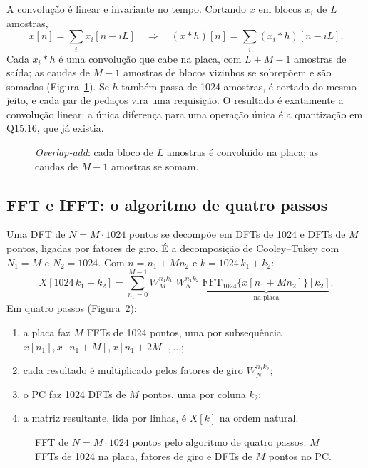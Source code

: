 A convolução é linear e invariante no tempo. Cortando \(x\) em blocos \(x_i\) de
\(L\) amostras,
\[
  x[n] = \sum_i x_i[n - iL]
  \quad\Longrightarrow\quad
  (x * h)[n] = \sum_i (x_i * h)[n - iL].
\]
Cada \(x_i * h\) é uma convolução que cabe na placa, com \(L + M - 1\) amostras
de saída; as caudas de \(M - 1\) amostras de blocos vizinhos se sobrepõem e são
somadas (Figura~\ref{fig:overlap-add}). Se \(h\) também passa de 1024
amostras, é cortado do mesmo jeito, e cada par de pedaços vira uma requisição.
O resultado é exatamente a convolução linear: a única diferença para uma
operação única é a quantização em Q15.16, que já existia.

\begin{figure}[htbp]
  \centering
  \caption{\emph{Overlap-add}: cada bloco de \(L\) amostras é convoluído na
    placa; as caudas de \(M-1\) amostras se somam.}
  \label{fig:overlap-add}
\end{figure}

\subsection{FFT e IFFT: o algoritmo de quatro passos}

Uma DFT de \(N = M \cdot 1024\) pontos se decompõe em DFTs de 1024 e DFTs de
\(M\) pontos, ligadas por fatores de giro. É a decomposição de Cooley--Tukey
com \(N_1 = M\) e \(N_2 = 1024\). Com \(n = n_1 + M n_2\) e
\(k = 1024\,k_1 + k_2\):
\[
  X[1024\,k_1 + k_2] = \sum_{n_1=0}^{M-1} W_M^{n_1 k_1}\;
    W_N^{n_1 k_2}\;
    \underbrace{\mathrm{FFT}_{1024}\{x[n_1 + M n_2]\}[k_2]}_{\text{na placa}}.
\]
Em quatro passos (Figura~\ref{fig:quatro-passos}):

\begin{enumerate}
  \item a placa faz \(M\) FFTs de 1024 pontos, uma por subsequência
    \(x[n_1], x[n_1 + M], x[n_1 + 2M], \ldots\);
  \item cada resultado é multiplicado pelos fatores de giro \(W_N^{n_1 k_2}\);
  \item o PC faz 1024 DFTs de \(M\) pontos, uma por coluna \(k_2\);
  \item a matriz resultante, lida por linhas, é \(X[k]\) na ordem natural.
\end{enumerate}

\begin{figure}[htbp]
  \centering
  \caption{FFT de \(N = M\cdot 1024\) pontos pelo algoritmo de quatro passos:
    \(M\) FFTs de 1024 na placa, fatores de giro e DFTs de \(M\) pontos no PC.}
  \label{fig:quatro-passos}
\end{figure}


